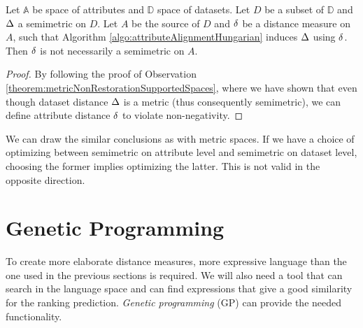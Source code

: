 \begin{observation}
	\label{corollary:semimetricNonRestorationSupportedSpaces}
	Let $\mathbb{A}$ be space of attributes and $\mathbb{D}$ space of datasets. Let $D$ be a subset of $\mathbb{D}$ and $\Delta$ a semimetric on $D$. Let $A$ be the source of $D$ and $\delta$ be a distance measure on $A$, such that Algorithm \ref{algo:attributeAlignmentHungarian} induces $\Delta$ using $\delta$. Then $\delta$ is not necessarily a semimetric on $A$.
	\begin{proof}
	By following the proof of Observation \ref{theorem:metricNonRestorationSupportedSpaces}, where we have shown that even though dataset distance $\Delta$ is a metric (thus consequently semimetric), we can define attribute distance $\delta$ to violate non-negativity.	
	\end{proof}
\end{observation}
We can draw the similar conclusions as with metric spaces. If we have a choice of optimizing between semimetric on attribute level and semimetric on dataset level, choosing the former implies optimizing the latter. This is not valid in the opposite direction.

\section{Genetic Programming}
\label{section:geneticProgramming}
To create more elaborate distance measures, more expressive language than the one used in the previous sections is required. We will also need a tool that can search in the language space and can find expressions that give a good similarity for the ranking prediction.
\emph{Genetic programming} (GP) can provide the needed functionality.

